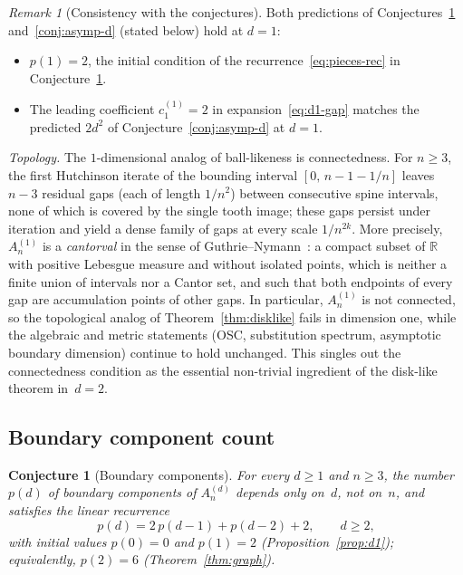 \documentclass{amsart}
\newtheorem{conjecture}[theorem]{Conjecture}
\theoremstyle{definition}
\theoremstyle{remark}
\newtheorem{remark}[theorem]{Remark}
\newcommand{\R}{\mathbb{R}}
\begin{document}
\begin{remark}[Consistency with the conjectures]
Both predictions of Conjectures~\ref{conj:pieces}
and~\ref{conj:asymp-d} (stated below) hold at $d = 1$:
\begin{itemize}
\item $p(1) = 2$, the initial condition of the
  recurrence~\eqref{eq:pieces-rec} in
  Conjecture~\ref{conj:pieces}.
\item The leading coefficient $c_1^{(1)} = 2$ in
  expansion~\eqref{eq:d1-gap} matches the predicted
  $2d^2$ of Conjecture~\ref{conj:asymp-d} at $d = 1$.
\end{itemize}
\end{remark}

\emph{Topology.} The $1$-dimensional analog of ball-likeness is
connectedness.  For $n \ge 3$, the first Hutchinson iterate of
the bounding interval $[0,\, n{-}1{-}1/n]$ leaves $n - 3$
residual gaps (each of length $1/n^2$) between consecutive
spine intervals, none of which is covered by the single tooth
image; these gaps persist under iteration and yield a dense
family of gaps at every scale $1/n^{2k}$.  More precisely,
$A_n^{(1)}$ is a \emph{cantorval} in the sense of
Guthrie--Nymann~\cite{guthrie-nymann}: a compact subset of $\R$
with positive Lebesgue measure and without isolated points,
which is neither a finite union of intervals nor a Cantor set,
and such that both endpoints of every gap are accumulation
points of other gaps.  In particular, $A_n^{(1)}$ is not
connected, so the topological analog of
Theorem~\ref{thm:disklike} fails in dimension one, while the
algebraic and metric statements (OSC, substitution spectrum,
asymptotic boundary dimension) continue to hold unchanged.
This singles out the connectedness condition as the essential
non-trivial ingredient of the disk-like theorem in~$d = 2$.

\subsection{Boundary component count}

\begin{conjecture}[Boundary components]\label{conj:pieces}
For every $d \ge 1$ and $n \ge 3$, the number $p(d)$ of boundary
components of $A_n^{(d)}$ depends only on~$d$, not on~$n$, and
satisfies the linear recurrence
\begin{equation}\label{eq:pieces-rec}
  p(d) = 2\,p(d{-}1) + p(d{-}2) + 2,
  \qquad d \ge 2,
\end{equation}
with initial values $p(0) = 0$ and $p(1) = 2$
(Proposition~\ref{prop:d1}); equivalently, $p(2) = 6$
(Theorem~\ref{thm:graph}).
\end{conjecture}
\end{document}
